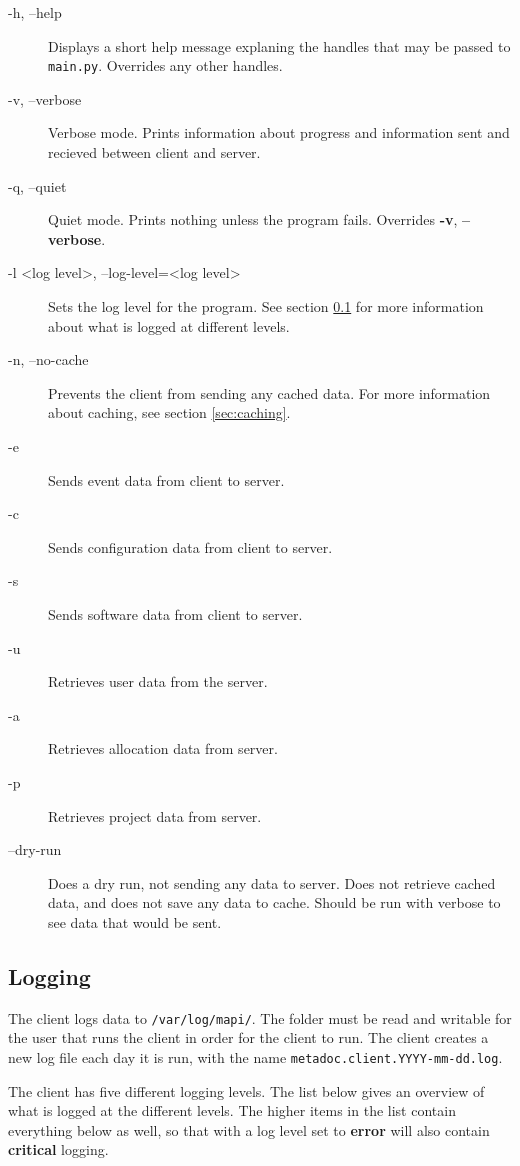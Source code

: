 \begin{description}
    \item[-h, --help]   Displays a short help message explaning the handles
    that may be passed to \texttt{main.py}. Overrides any other handles.
    \item[-v, --verbose]    Verbose mode. Prints information about progress and
    information sent and recieved between client and server. 
    \item[-q, --quiet]  Quiet mode. Prints nothing unless the program fails.
    Overrides \textbf{-v}, \textbf{--verbose}.
    \item[-l \textless log level\textgreater, --log-level=\textless log
    level\textgreater] Sets the log level for the program. See section 
    \ref{sec:logging} for more information about what is logged at different 
    levels.
    \item[-n, --no-cache]   Prevents the client from sending any cached data.
    For more information about caching, see section \ref{sec:caching}.
    \item[-e]   Sends event data from client to server.
    \item[-c]   Sends configuration data from client to server.
    \item[-s]   Sends software data from client to server.
    \item[-u]   Retrieves user data from the server.
    \item[-a]   Retrieves allocation data from server.
    \item[-p]   Retrieves project data from server.
    \item[--dry-run]    Does a dry run, not sending any data to server. Does
        not retrieve cached data, and does not save any data to cache.
        Should be run with verbose to see data that would be sent.
\end{description}

\subsection{Logging}
\label{sec:logging}
The client logs data to \texttt{/var/log/mapi/}. The folder must be read and
writable for the user that runs the client in order for the client to run.
The client creates a new log file each day it is run, with the name 
\texttt{metadoc.client.YYYY-mm-dd.log}. 

The client has five different logging levels. The list below gives an overview
of what is logged at the different levels. The higher items in the list contain
everything below as well, so that with a log level set to \textbf{error} will
also contain \textbf{critical} logging.

